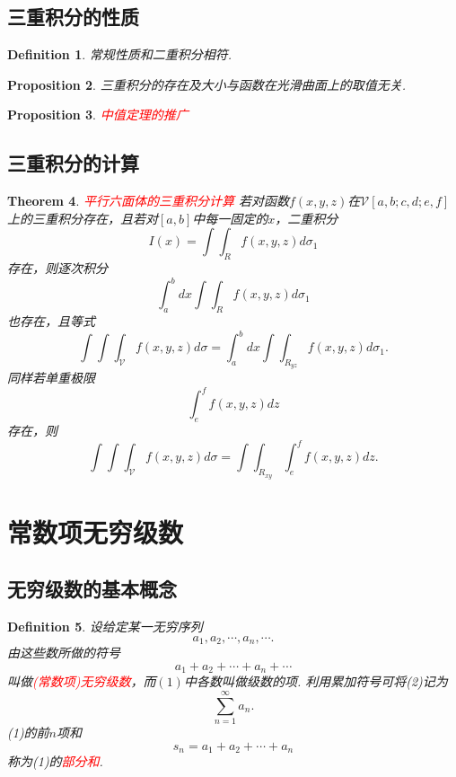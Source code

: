 \documentclass{article}
\newtheorem{theorem}{Theorem}[section]
\newtheorem{proposition}[theorem]{Proposition}
\newtheorem{definition}[theorem]{Definition}
\newcommand{\redt}[1]{\textcolor{red}{#1}}
\begin{document}
\subsection{三重积分的性质}

\begin{definition}
\rm 常规性质和二重积分相符.
\end{definition}

\begin{proposition}
\rm 三重积分的存在及大小与函数在光滑曲面上的取值无关. 
\end{proposition}

\begin{proposition}
\rm \redt{中值定理的推广}
\end{proposition}

\subsection{三重积分的计算}

\begin{theorem}
\rm \redt{平行六面体的三重积分计算} 若对函数$f(x,y,z)$在$\mathcal{V}[a,b;c,d;e,f]$上的三重积分存在，且若对$[a,b]$中每一固定的$x$，二重积分
$$
I(x) = \int\int_{R}f(x,y,z)d\sigma_1
$$
存在，则逐次积分
$$
\int_a^b dx \int\int_{R}f(x,y,z)d\sigma_1
$$
也存在，且等式
$$
\int\int\int_{\mathcal{V}} f(x,y,z)d\sigma = \int_a^b dx \int\int_{R_{yz}}f(x,y,z)d\sigma_1.
$$
同样若单重极限
$$
\int_e^f f(x,y,z)dz
$$
存在，则
$$
\int\int\int_{\mathcal{V}} f(x,y,z)d\sigma = \int\int_{R_{xy}}\int_e^f f(x,y,z)dz.
$$
\end{theorem}

\newpage
\section{常数项无穷级数}

\subsection{无穷级数的基本概念}

\begin{definition}
\rm 设给定某一无穷序列
\begin{equation}
a_1,a_2,\cdots,a_n,\cdots.
\end{equation}
由这些数所做的符号
\begin{equation}
a_1 + a_2 + \cdots + a_n + \cdots
\end{equation}
叫做\redt{(常数项)无穷级数}，而$(1)$中各数叫做级数的项. 利用累加符号可将(2)记为
$$
\sum\limits_{n=1}^\infty a_n.
$$
(1)的前$n$项和
$$
s_n = a_1+a_2+\cdots+a_n
$$
称为(1)的\redt{部分和}.
\end{definition}
\end{document}

